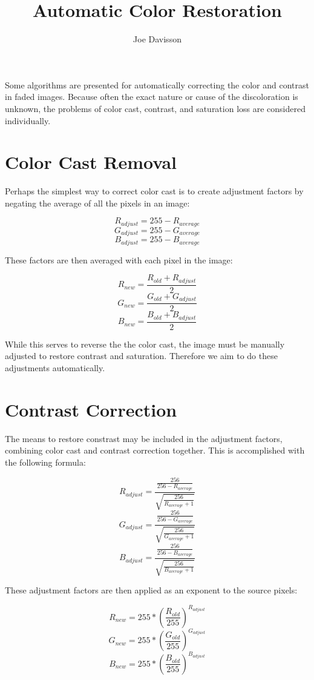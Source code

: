 \documentclass{article}
\title{Automatic Color Restoration}
\author{Joe Davisson} %
\begin{document}
\maketitle

Some algorithms are presented for automatically correcting the
color and contrast in faded images. Because often the exact nature or cause
of the discoloration is unknown, the problems of color cast, contrast, and
saturation loss are considered individually.

\section{Color Cast Removal}
Perhaps the simplest way to correct color cast is to create adjustment
factors by negating the average of all the pixels in an image:

\[ R_{adjust} = 255 - R_{average} \]
\[ G_{adjust} = 255 - G_{average} \]
\[ B_{adjust} = 255 - B_{average} \]

These factors are then averaged with each pixel in the image:

\[ R_{new} = \frac{R_{old} + R_{adjust} }{2} \]
\[ G_{new} = \frac{G_{old} + G_{adjust} }{2} \]
\[ B_{new} = \frac{B_{old} + B_{adjust} }{2} \]

While this serves to reverse the the color cast, the image must be manually
adjusted to restore contrast and saturation. Therefore we aim to do these
adjustments automatically.

\section{Contrast Correction}
The means to restore constrast may be included in the adjustment factors,
combining color cast and contrast correction together. This is accomplished
with the following formula:

\[ R_{adjust} = \frac{\frac{256} {256 - R_{average}}}
                     {\sqrt{\frac{256} { R_{average} + 1}}} \]
\[ G_{adjust} = \frac{\frac{256} {256 - G_{average}}}
                     {\sqrt{\frac{256} { G_{average} + 1}}} \]
\[ B_{adjust} = \frac{\frac{256} {256 - B_{average}}}
                     {\sqrt{\frac{256} { B_{average} + 1}}} \]

These adjustment factors are then applied as an exponent to the source pixels:

\[ R_{new} = 255 * (\frac{ R_{old}}{255}) ^ {R_{adjust}} \]
\[ G_{new} = 255 * (\frac{ G_{old}}{255}) ^ {G_{adjust}} \]
\[ B_{new} = 255 * (\frac{ B_{old}}{255}) ^ {B_{adjust}} \]
\end{document}
